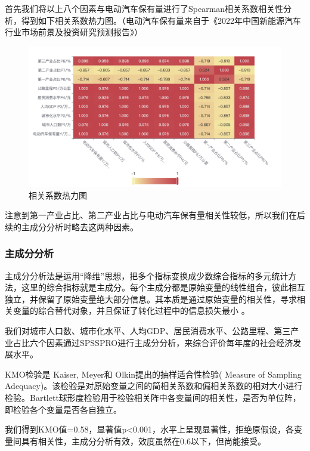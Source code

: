 \documentclass[12pt, a4paper, oneside]{ctexart}
\begin{document}
首先我们将以上八个因素与电动汽车保有量进行了Spearman相关系数相关性分析，得到如下相关系数热力图。（电动汽车保有量来自于《2022年中国新能源汽车行业市场前景及投资研究预测报告》\cite{cite:预测报告}）

\begin{figure}[H]
  \centering
  \includegraphics[width=\textwidth]{pic/相关系数热力图 (2).png}
  \caption{相关系数热力图}
  \label{fig:相关系数热力图}
\end{figure}

注意到第一产业占比、第二产业占比与电动汽车保有量相关性较低，所以我们在后续的主成分分析时略去这两种因素。

\subsubsection{{主成分分析}}

主成分分析法是运用``降维''思想，把多个指标变换成少数综合指标的多元统计方法，这里的综合指标就是主成分。每个主成分都是原始变量的线性组合，彼此相互独立，并保留了原始变量绝大部分信息。其本质是通过原始变量的相关性，寻求相关变量的综合替代对象，并且保证了转化过程中的信息损失最小
。

我们对城市人口数、城市化水平、人均GDP、居民消费水平、公路里程、第三产业占比六个因素通过SPSSPRO进行主成分分析，来综合评价每年度的社会经济发展水平。

KMO检验是 Kaiser, Meyer和 Olkin提出的抽样适合性检验( Measure of Sampling
Adequacy)。该检验是对原始变量之间的简相关系数和偏相关系数的相对大小进行检验。Bartlett球形度检验用于检验相关阵中各变量间的相关性，是否为单位阵，即检验各个变量是否各自独立。

我们得到KMO值=0.58，显著值p\textless0.001，水平上呈现显著性，拒绝原假设，各变量间具有相关性，主成分分析有效，效度虽然在0.6以下，但尚能接受。
\end{document}
